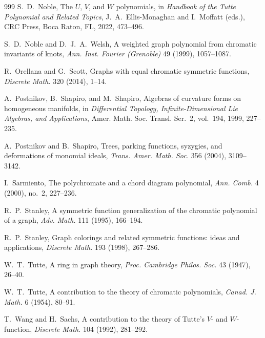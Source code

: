 \documentclass[11pt]{article}
\theoremstyle{plain}
\theoremstyle{definition}
\numberwithin{equation}{section}
\begin{document}
\begin{thebibliography}{999}
  S.~D.~Noble,
  The $U$, $V$, and $W$ polynomials,
  in \emph{Handbook of the Tutte Polynomial and Related Topics},
  J.~A.~Ellis-Monaghan and I.~Moffatt (eds.),
  CRC Press, Boca Raton, FL, 2022, 473--496.

  S.~D.~Noble and D.~J.~A.~Welsh,
  A weighted graph polynomial from chromatic invariants of knots,
  \emph{Ann. Inst. Fourier (Grenoble)} 49 (1999), 1057--1087.

  R.~Orellana and G.~Scott,
  Graphs with equal chromatic symmetric functions,
  \emph{Discrete Math.} 320 (2014), 1--14.

  A.~Postnikov, B.~Shapiro, and M.~Shapiro,
  Algebras of curvature forms on homogeneous manifolds,
  in \emph{Differential Topology, Infinite-Dimensional Lie Algebras, and Applications},
  Amer. Math. Soc. Transl. Ser.~2, vol.~194, 1999, 227--235.

  A.~Postnikov and B.~Shapiro,
  Trees, parking functions, syzygies, and deformations of monomial ideals,
  \emph{Trans. Amer. Math. Soc.} 356 (2004), 3109--3142.

  I.~Sarmiento,
  The polychromate and a chord diagram polynomial,
  \emph{Ann. Comb.} 4 (2000), no.~2, 227--236.


 R.~P.~Stanley, A symmetric function generalization of the chromatic polynomial of a graph, \emph{Adv. Math.} 111 (1995), 166--194.

  R.~P.~Stanley, Graph colorings and related symmetric functions: ideas and applications, \emph{Discrete Math.} 193 (1998), 267--286.

  W.~T.~Tutte,
  A ring in graph theory,
  \emph{Proc. Cambridge Philos. Soc.} 43 (1947), 26--40.

  W.~T.~Tutte, A contribution to the theory of chromatic polynomials,
  \emph{Canad. J. Math.} 6 (1954), 80--91.

T.~Wang and H.~Sachs,
A contribution to the theory of Tutte's $V$- and $W$-function,
\emph{Discrete Math.} 104 (1992), 281--292.

\end{thebibliography}
\end{document}
